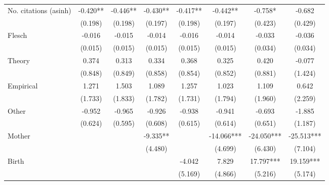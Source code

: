 \begin{table}
\begin{adjustwidth}{-0.085cm}{}
\begin{threeparttable}
\begin{tabular}{p{2.64cm}SSSSSSS}
            No. citations (asinh)         &      -0.420** &      -0.446** &      -0.430** &      -0.417** &      -0.442** &      -0.758*  &      -0.682   \\
                                          &     (0.198)   &     (0.198)   &     (0.197)   &     (0.198)   &     (0.197)   &     (0.423)   &     (0.429)   \\
            Flesch                        &      -0.016   &      -0.015   &      -0.014   &      -0.016   &      -0.014   &      -0.033   &      -0.036   \\
                                          &     (0.015)   &     (0.015)   &     (0.015)   &     (0.015)   &     (0.015)   &     (0.034)   &     (0.034)   \\
            Theory                        &       0.374   &       0.313   &       0.334   &       0.368   &       0.325   &       0.420   &      -0.077   \\
                                          &     (0.848)   &     (0.849)   &     (0.858)   &     (0.854)   &     (0.852)   &     (0.881)   &     (1.424)   \\
            Empirical                     &       1.271   &       1.503   &       1.089   &       1.257   &       1.023   &       1.109   &       0.642   \\
                                          &     (1.733)   &     (1.833)   &     (1.782)   &     (1.731)   &     (1.794)   &     (1.960)   &     (2.259)   \\
            Other                         &      -0.952   &      -0.965   &      -0.926   &      -0.938   &      -0.941   &      -0.693   &      -1.885   \\
                                          &     (0.624)   &     (0.595)   &     (0.608)   &     (0.615)   &     (0.614)   &     (0.651)   &     (1.187)   \\
            Mother                        &               &               &      -9.335** &               &     -14.066***&     -24.050***&     -25.513***\\
                                          &               &               &     (4.480)   &               &     (4.699)   &     (6.430)   &     (7.104)   \\
            Birth                         &               &               &               &      -4.042   &       7.829   &      17.797***&      19.159***\\
                                          &               &               &               &     (5.169)   &     (4.866)   &     (5.216)   &     (5.174)   \\

\end{tabular}
\end{threeparttable}
\end{adjustwidth}
\end{table}

